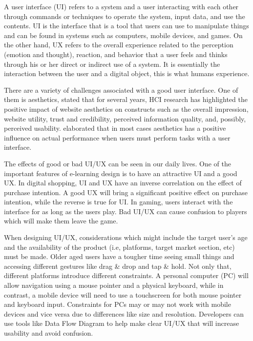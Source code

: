 \documentclass[
  11pt, %
]{assignment}
\begin{document}
A user interface (UI) refers to a system and a user interacting with each other through commands or techniques to operate the system, input data, and use the contents\autocite{Jooh}. UI is the interface that is a tool that users can use to manipulate things\autocite{Roth2017UserIA} and can be found in systems such as computers, mobile devices, and games\autocite{Jooh}. On the other hand, UX refers to the overall experience related to the perception (emotion and thought), reaction, and behavior that a user feels and thinks through his or her direct or indirect use of a system\autocite{Jooh}. It is essentially the interaction between the user and a digital object, this is what humans experience\autocite{Roth2017UserIA}.

There are a variety of challenges associated with a good user interface. One of them is aesthetics, \autocite{GlenaH} stated that for several years, HCI research has highlighted the positive impact of website aesthetics on constructs such as the overall impression, website utility, trust and credibility, perceived information quality, and, possibly, perceived usability. \autocite{SchmidtWolff+2018+41+55} elaborated that in most cases aesthetics has a positive influence on actual performance when users must perform tasks with a user interface.

The effects of good or bad UI/UX can be seen in our daily lives. One of the important features of e-learning design is to have an attractive UI and a good UX\autocite{Handayani2020GamifiedLP}. In digital shopping, UI and UX have an inverse correlation on the effect of purchase intention\autocite{Watulingas}. A good UX will bring a significant positive effect on purchase intention, while the reverse is true for UI\autocite{Watulingas}. In gaming, users interact with the interface for as long as the users play. Bad UI/UX can cause confusion to players which will make them leave the game\autocite{Kurniawan2021UIUXMG}.

When designing UI/UX, considerations which might include the target user's age and the availability of the product (i.e, platforms, target market section, etc) must be made. Older aged users have a tougher time seeing small things and accessing different gestures like drag \& drop and tap \& hold\autocite{Salman2018UsabilityEO}. Not only that, different platforms introduce different constraints. A personal computer (PC) will allow navigation using a mouse pointer and a physical keyboard, while in contrast, a mobile device will need to use a touchscreen for both mouse pointer and keyboard input. Constraints for PCs may or may not work with mobile devices and vice versa due to differences like size and resolution\autocite{Garca2017ValidationON}. Developers can use tools like Data Flow Diagram to help make clear UI/UX that will increase usability and avoid confusion\autocite{Wulandari2017DesignDF}.
\end{document}
